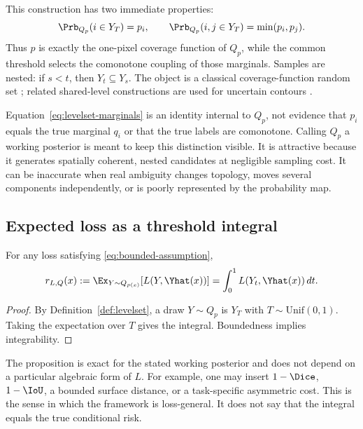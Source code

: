 This construction has two immediate properties:
\begin{equation}\label{eq:levelset-marginals}
  \Prb_{Q_p}(i\in Y_T)=p_i,
  \qquad
  \Prb_{Q_p}(i,j\in Y_T)=\min(p_i,p_j).
\end{equation}
Thus $p$ is exactly the one-pixel coverage function of $Q_p$, while the common
threshold selects the comonotone coupling of those marginals. Samples are nested:
if $s<t$, then $Y_t\subseteq Y_s$. The object is a classical coverage-function
random set \cite{goodman,molchanov}; related shared-level constructions are used for
uncertain contours \cite{poethkow,bolin}.

Equation~\eqref{eq:levelset-marginals} is an identity internal to $Q_p$, not evidence
that $p_i$ equals the true marginal $q_i$ or that the true labels are comonotone.
Calling $Q_p$ a working posterior is meant to keep this distinction visible. It is
attractive because it generates spatially coherent, nested candidates at negligible
sampling cost. It can be inaccurate when real ambiguity changes topology, moves
several components independently, or is poorly represented by the probability map.

\subsection{Expected loss as a threshold integral}

\begin{proposition}\label{prop:integral}
For any loss satisfying \eqref{eq:bounded-assumption},
\begin{equation}\label{eq:integral}
  r_{L,Q}(x)
  :=\Ex_{Y\sim Q_{p(x)}}\!\left[L(Y,\Yhat(x))\right]
  =\int_0^1 L(Y_t,\Yhat(x))\,dt .
\end{equation}
\end{proposition}
\begin{proof}
By Definition~\ref{def:levelset}, a draw $Y\sim Q_p$ is $Y_T$ with
$T\sim\mathrm{Unif}(0,1)$. Taking the expectation over $T$ gives the integral.
Boundedness implies integrability.
\end{proof}

The proposition is exact for the stated working posterior and does not depend on a
particular algebraic form of $L$. For example, one may insert $1-\Dice$, $1-\IoU$,
a bounded surface distance, or a task-specific asymmetric cost. This is the sense in
which the framework is loss-general. It does not say that the integral equals the
true conditional risk.

